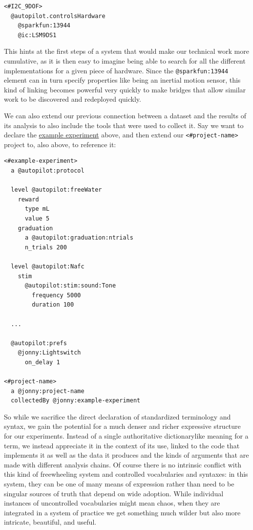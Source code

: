 \documentclass[10pt]{tufte-book}
\begin{document}
\begin{verbatim}
<#I2C_9DOF>
  @autopilot.controlsHardware
    @sparkfun:13944
    @ic:LSM9DS1
\end{verbatim}

This hints at the first steps of a system that would make our technical
work more cumulative, as it is then easy to imagine being able to search
for all the different implementations for a given piece of hardware.
Since the \texttt{@sparkfun:13944} element can in turn specify
properties like being an inertial motion sensor, this kind of linking
becomes powerful very quickly to make bridges that allow similar work to
be discovered and redeployed quickly.

We can also extend our previous connection between a dataset and the
results of its analysis to also include the tools that were used to
collect it. Say we want to declare the
\href{https://gist.github.com/sneakers-the-rat/eebe675326a157df49f66f62c4e33a6e}{example
experiment} above, and then extend our
\texttt{\textless{}\#project-name\textgreater{}} project to, also above,
to reference it:

\begin{verbatim}
<#example-experiment>
  a @autopilot:protocol

  level @autopilot:freeWater
    reward
      type mL
      value 5
    graduation 
      a @autopilot:graduation:ntrials
      n_trials 200

  level @autopilot:Nafc
    stim
      @autopilot:stim:sound:Tone
        frequency 5000
        duration 100

  ...

  @autopilot:prefs
    @jonny:Lightswitch
      on_delay 1

<#project-name>
  a @jonny:project-name
  collectedBy @jonny:example-experiment
\end{verbatim}

So while we sacrifice the direct declaration of standardized terminology
and syntax, we gain the potential for a much denser and richer
expressive structure for our experiments. Instead of a single
authoritative dictionarylike meaning for a term, we instead appreciate
it in the context of its use, linked to the code that implements it as
well as the data it produces and the kinds of arguments that are made
with different analysis chains. Of course there is no intrinsic conflict
with this kind of freewheeling system and controlled vocabularies and
syntaxes: in this system, they can be one of many means of expression
rather than need to be singular sources of truth that depend on wide
adoption. While individual instances of uncontrolled vocabularies might
mean chaos, when they are integrated in a system of practice we get
something much wilder but also more intricate, beautiful, and useful.
\end{document}
